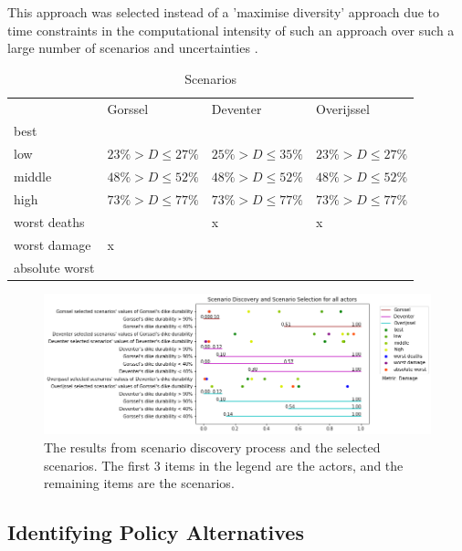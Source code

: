 This approach was selected instead of a 'maximise diversity' approach due to time constraints in the computational intensity of such an approach over such a large number of scenarios and uncertainties \parencite{eker_including_2018}.

\begin{table}[h!]
\caption{Scenarios}
\label{tab:scenarios}
\centering
\begin{tabular}{llll}
               & Gorssel& Deventer & Overijssel \\
best           & & & \\
low            & $23\%> D \leq 27\%$ & $25\%> D \leq 35\%$ & $23\%> D \leq 27\%$\\
middle         & $48\%> D \leq 52\%$ & $48\%> D \leq 52\%$ & $48\%> D \leq 52\%$ \\
high           & $73\%> D \leq 77\%$ & $73\%> D \leq 77\%$ & $73\%> D \leq 77\%$            \\
worst deaths   & & x & x \\
worst damage   & x &          & \\
absolute worst &  &          &           
\end{tabular}
\end{table}

\begin{figure}[h]
    \centering
    \includegraphics[width=\textwidth]{report/figures/results/scenario_discovery.png}
    \caption{The results from scenario discovery process and the selected scenarios. The first 3 items in the legend are the actors, and the remaining items are the scenarios.}
    \label{fig:prim}
\end{figure}


\subsection{Identifying Policy Alternatives}

